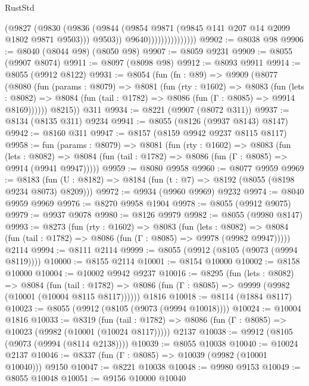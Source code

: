 \begin{lexlean}{RustStd}
\begin{coremodule}
{\begin{coremodule}
{{{{{{{{{{{{{{{{{{{{{{{{{{{{{{{{{{{{{{{{{{{{{{{                                (@9827
                                  (@9830
                                    (@9836
                                      (@9844
                                        (@9854 @9871 (@9845 @141 @207 @14 @2099 @1802 @9871 @9503)))
                                      @9503))
                                  @9640)))))))))))))))
@9902 := @8038 @98
@9906 := @8040 (@8044 @98) (@8050 @98)
@9907 := @8059 @9231
@9909 := @8055 (@9907 @8074)
@9911 := @8097 (@8098 @98)
@9912 := @8093 @9911
@9914 := @8055 (@9912 @8122)
@9931 := @8054
    (fun (fn : @89) =>
    @9909
      (@8077
        (@8080
          (fun (params : @8079) =>
          @8081
            (fun (rty : @1602) =>
            @8083
              (fun (lets : @8082) =>
              @8084 (fun (tail : @1782) => @8086 (fun (Γ : @8085) => @9914 @8169))))))
        @8215))
    @311
@9934 := @8221 (@9907 (@8072 @311))
@9937 := @8134 (@8135 @311) @9234
@9941 := @8055 (@8126 (@9937 @8143) @8147)
@9942 := @8160 @311
@9947 := @8157 (@8159 @9942 @9237 @8115 @8117)
@9958 := fun (params : @8079) =>
  @8081
    (fun (rty : @1602) =>
    @8083
      (fun (lets : @8082) =>
      @8084 (fun (tail : @1782) => @8086 (fun (Γ : @8085) => @9914 (@9941 @9947)))))
@9959 := @8080 @9958
@9960 := @8077 @9959
@9969 := @8183 (fun (U : @8182) => @8184 (fun (t : @7) => @8192 (@8055 (@8198 @9234 @8073) @8209)))
@9972 := @9934 (@9960 @9969) @9232
@9974 := @8040 @9959 @9969
@9976 := @8270 @9958 @1904
@9978 := @8055 (@9912 @9075)
@9979 := @9937 @9078
@9980 := @8126 @9979
@9982 := @8055 (@9980 @8147)
@9993 := @8273
    (fun (rty : @1602) =>
    @8083
      (fun (lets : @8082) =>
      @8084 (fun (tail : @1782) => @8086 (fun (Γ : @8085) => @9978 (@9982 @9947)))))
    @2114
@9994 := @8111 @2114
@9999 := @8055 (@9912 (@8105 (@9073 (@9994 @8119))))
@10000 := @8155 @2114
@10001 := @8154 @10000
@10002 := @8158 @10000
@10004 := @10002 @9942 @9237
@10016 := @8295
    (fun (lets : @8082) =>
    @8084
      (fun (tail : @1782) =>
      @8086 (fun (Γ : @8085) => @9999 (@9982 (@10001 (@10004 @8115 @8117))))))
    @1816
@10018 := @8114 (@1884 @8117)
@10023 := @8055 (@9912 (@8105 (@9073 (@9994 @10018))))
@10024 := @10004 @1816
@10033 := @8319
    (fun (tail : @1782) => @8086 (fun (Γ : @8085) => @10023 (@9982 (@10001 (@10024 @8117)))))
    @2137
@10038 := @9912 (@8105 (@9073 (@9994 (@8114 @2138))))
@10039 := @8055 @10038
@10040 := @10024 @2137
@10046 := @8337 (fun (Γ : @8085) => @10039 (@9982 (@10001 @10040))) @9150
@10047 := @8221 @10038
@10048 := @9980 @9153
@10049 := @8055 @10048
@10051 := @9156 @10000 @10040
}}}}}}}}}}}}}}}}}}}}}}}}}}}}}}}}}}}}}}}}}}}}}}}
\end{coremodule}}
\end{coremodule}
\end{lexlean}
